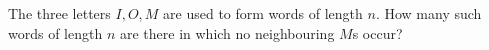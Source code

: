 The three letters $I, O, M$ are used to form words of length $n$. 
How many such words of length $n$ are there in which no neighbouring $M$s occur?
